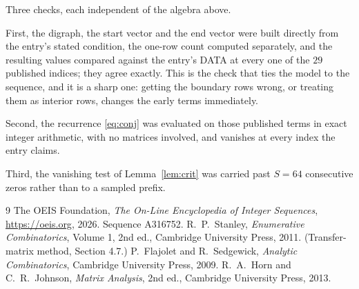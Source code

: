 \documentclass[11pt,a4paper]{article}
\theoremstyle{plain}
\theoremstyle{definition}
\begin{document}
Three checks, each independent of the algebra above.

First, the digraph, the start vector and the end vector were built directly from the
entry's stated condition, the one-row count computed separately, and the resulting values
compared against the entry's DATA at every one of the $29$ published indices; they
agree exactly. This is the check that ties the model to the sequence, and it is a sharp one:
getting the boundary rows wrong, or treating them as interior rows, changes the early terms
immediately.

Second, the recurrence \eqref{eq:conj} was evaluated on those published terms in exact
integer arithmetic, with no matrices involved, and vanishes at every index the entry claims.

Third, the vanishing test of Lemma~\ref{lem:crit} was carried past $S=64$ consecutive
zeros rather than to a sampled prefix.

\begin{thebibliography}{9}
 The OEIS Foundation, \emph{The On-Line Encyclopedia of Integer
Sequences}, \url{https://oeis.org}, 2026. Sequence A316752.
 R.~P.~Stanley, \emph{Enumerative Combinatorics}, Volume 1, 2nd ed.,
Cambridge University Press, 2011. (Transfer-matrix method, Section 4.7.)
 P.~Flajolet and R.~Sedgewick, \emph{Analytic Combinatorics}, Cambridge
University Press, 2009.
 R.~A.~Horn and C.~R.~Johnson, \emph{Matrix Analysis}, 2nd ed., Cambridge
University Press, 2013.
\end{thebibliography}
\end{document}
